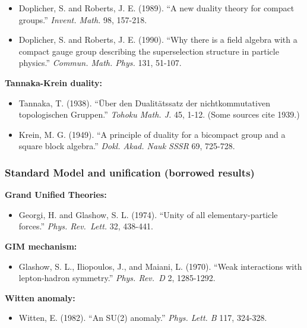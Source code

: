 \documentclass[
]{article}
\providecommand{\tightlist}{%
  \setlength{\itemsep}{0pt}\setlength{\parskip}{0pt}}
\begin{document}
\begin{itemize}
\tightlist
\item
  Doplicher, S. and Roberts, J. E. (1989). ``A new duality theory for
  compact groups.'' \emph{Invent. Math.} 98, 157-218.
\item
  Doplicher, S. and Roberts, J. E. (1990). ``Why there is a field
  algebra with a compact gauge group describing the superselection
  structure in particle physics.'' \emph{Commun. Math. Phys.} 131,
  51-107.
\end{itemize}

\textbf{Tannaka-Krein duality:}

\begin{itemize}
\tightlist
\item
  Tannaka, T. (1938). ``Über den Dualitätssatz der nichtkommutativen
  topologischen Gruppen.'' \emph{Tohoku Math. J.} 45, 1-12. (Some
  sources cite 1939.)
\item
  Krein, M. G. (1949). ``A principle of duality for a bicompact group
  and a square block algebra.'' \emph{Dokl. Akad. Nauk SSSR} 69,
  725-728.
\end{itemize}

\subsubsection{Standard Model and unification (borrowed
results)}\label{standard-model-and-unification-borrowed-results}

\textbf{Grand Unified Theories:}

\begin{itemize}
\tightlist
\item
  Georgi, H. and Glashow, S. L. (1974). ``Unity of all
  elementary-particle forces.'' \emph{Phys. Rev.~Lett.} 32, 438-441.
\end{itemize}

\textbf{GIM mechanism:}

\begin{itemize}
\tightlist
\item
  Glashow, S. L., Iliopoulos, J., and Maiani, L. (1970). ``Weak
  interactions with lepton-hadron symmetry.'' \emph{Phys. Rev.~D} 2,
  1285-1292.
\end{itemize}

\textbf{Witten anomaly:}

\begin{itemize}
\tightlist
\item
  Witten, E. (1982). ``An SU(2) anomaly.'' \emph{Phys. Lett. B} 117,
  324-328.
\end{itemize}
\end{document}
